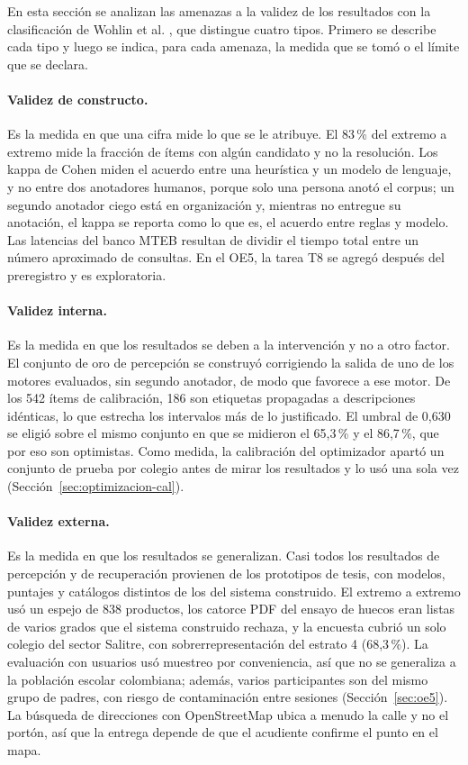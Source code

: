 En esta sección se analizan las amenazas a la validez de los resultados con la clasificación de
Wohlin et al. \citep{wohlin_experimentation_2012}, que distingue cuatro tipos. Primero se describe cada tipo y
luego se indica, para cada amenaza, la medida que se tomó o el límite que se declara.

\paragraph{Validez de constructo.} Es la medida en que una cifra mide lo que se le atribuye. El
83\,\% del extremo a extremo mide la fracción de ítems con algún candidato y no la resolución. Los
kappa de Cohen \citep{cohen_coefficient_1960} miden el acuerdo entre una heurística y un modelo de
lenguaje, y no entre dos anotadores humanos, porque solo una persona anotó el corpus; un segundo
anotador ciego está en organización y, mientras no entregue su anotación, el kappa se reporta como
lo que es, el acuerdo entre reglas y modelo. Las latencias del banco MTEB resultan de dividir el
tiempo total entre un número aproximado de consultas. En el OE5, la tarea T8 se agregó después del preregistro y
es exploratoria.

\paragraph{Validez interna.} Es la medida en que los resultados se deben a la intervención y no a
otro factor. El conjunto de oro de percepción se construyó corrigiendo la salida de uno de los
motores evaluados, sin segundo anotador, de modo que favorece a ese motor. De los 542 ítems de
calibración, 186 son etiquetas propagadas a descripciones idénticas, lo que estrecha los intervalos
más de lo justificado. El umbral de 0,630 se eligió sobre el mismo conjunto en que se midieron el
65,3\,\% y el 86,7\,\%, que por eso son optimistas. Como medida, la calibración del optimizador apartó un conjunto de prueba por colegio antes de
mirar los resultados y lo usó una sola vez (Sección~\ref{sec:optimizacion-cal}).

\paragraph{Validez externa.} Es la medida en que los resultados se generalizan. Casi todos los
resultados de percepción y de recuperación provienen de los prototipos de tesis, con modelos,
puntajes y catálogos distintos de los del sistema construido. El extremo a extremo usó un espejo de
838 productos, los catorce PDF del ensayo de huecos eran listas de varios grados que el sistema
construido rechaza, y la encuesta cubrió un solo colegio del sector Salitre, con
sobrerrepresentación del estrato 4 (68,3\,\%). La evaluación con usuarios usó muestreo por
conveniencia, así que no se generaliza a la población escolar colombiana; además, varios
participantes son del mismo grupo de padres, con riesgo de contaminación entre sesiones
(Sección~\ref{sec:oe5}). La búsqueda de direcciones con OpenStreetMap ubica a menudo la calle y
no el portón, así que la entrega depende de que el acudiente confirme el punto en el mapa.

